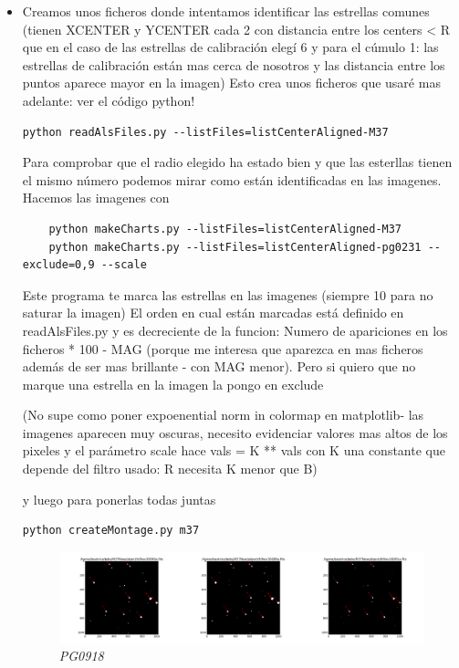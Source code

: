 \documentclass{article}
\begin{document}
\begin{itemize}
{\begin{verbatim}
\end{verbatim}
}

\item 
Creamos unos ficheros donde intentamos identificar las estrellas comunes (tienen XCENTER y YCENTER cada 2 con distancia entre los centers < R que en el caso de las estrellas de calibración elegí 6 y para el cúmulo 1: las estrellas de calibración están mas cerca de nosotros y las distancia entre los puntos aparece mayor en la imagen)
Esto crea unos  ficheros  que usaré mas adelante: ver el código python!
\begin{verbatim}
python readAlsFiles.py --listFiles=listCenterAligned-M37
\end{verbatim}
Para comprobar que el radio elegido ha estado bien y que las esterllas tienen el mismo número podemos mirar como están identificadas en las imagenes. Hacemos las imagenes con
\begin{verbatim}
 	python makeCharts.py --listFiles=listCenterAligned-M37
	python makeCharts.py --listFiles=listCenterAligned-pg0231 --exclude=0,9 --scale
\end{verbatim}

Este programa te marca las estrellas en las imagenes (siempre 10 para no saturar la imagen)
El orden en cual están marcadas está definido en readAlsFiles.py y es decreciente de la funcion:  Numero de apariciones en los ficheros * 100 - MAG  (porque me interesa que aparezca en mas ficheros además de ser mas brillante - con MAG menor). Pero si quiero que no marque una estrella en la imagen la pongo en exclude

(No supe como poner expoenential norm in colormap en matplotlib- las imagenes aparecen muy oscuras, necesito evidenciar valores mas altos de los pixeles y el parámetro scale hace vals = K ** vals con K una constante que depende del filtro usado: R necesita K menor que B)

y luego para ponerlas todas juntas 
\begin{verbatim}
python createMontage.py m37
\end{verbatim}

\begin{figure}[!ht]
 \centering
 \includegraphics[scale=0.25]{MONTAGEpg0918.png}
 \caption{\emph{PG0918}}
\end{figure}


\end{itemize}
\end{document}
